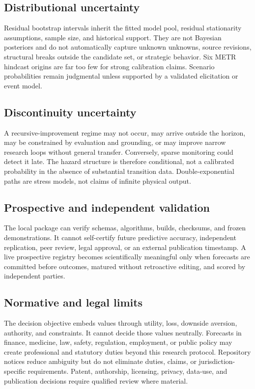 \subsection{Distributional uncertainty}

Residual bootstrap intervals inherit the fitted model pool, residual stationarity assumptions, sample size, and historical support. They are not Bayesian posteriors and do not automatically capture unknown unknowns, source revisions, structural breaks outside the candidate set, or strategic behavior. Six METR hindcast origins are far too few for strong calibration claims. Scenario probabilities remain judgmental unless supported by a validated elicitation or event model.

\subsection{Discontinuity uncertainty}

A recursive-improvement regime may not occur, may arrive outside the horizon, may be constrained by evaluation and grounding, or may improve narrow research loops without general transfer. Conversely, sparse monitoring could detect it late. The hazard structure is therefore conditional, not a calibrated probability in the absence of substantial transition data. Double-exponential paths are stress models, not claims of infinite physical output.

\subsection{Prospective and independent validation}

The local package can verify schemas, algorithms, builds, checksums, and frozen demonstrations. It cannot self-certify future predictive accuracy, independent replication, peer review, legal approval, or an external publication timestamp. A live prospective registry becomes scientifically meaningful only when forecasts are committed before outcomes, matured without retroactive editing, and scored by independent parties.

\subsection{Normative and legal limits}

The decision objective embeds values through utility, loss, downside aversion, authority, and constraints. It cannot decide those values neutrally. Forecasts in finance, medicine, law, safety, regulation, employment, or public policy may create professional and statutory duties beyond this research protocol. Repository notices reduce ambiguity but do not eliminate duties, claims, or jurisdiction-specific requirements. Patent, authorship, licensing, privacy, data-use, and publication decisions require qualified review where material.

